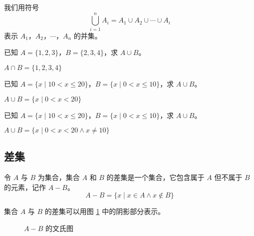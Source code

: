 我们用符号
\begin{equation*}
    \bigcup_{i=1}^n A_i=A_1 \cup A_2 \cup \cdots \cup A_i
\end{equation*}
表示 $A_1$，$A_2$，$\cdots$，$A_n$ 的并集。
\begin{collections}
    \begin{example}
        已知 $A = \{ 1, 2, 3 \}$，$B = \{ 2, 3, 4\}$，求 $A \cup B$。
    \end{example}
    \begin{solution}
        $A \cap B = \{1, 2, 3, 4\}$
    \end{solution}

    \spare

    \begin{example}
        已知 $A = \{ x \mid 10 < x \leq 20 \}$，$B = \{ x \mid 0 < x \leq 10 \}$，求 $A \cup B$。
    \end{example}
    \begin{solution}
        $A \cup B = \{ x \mid 0 < x < 20\}$
    \end{solution}

    \spare

    \begin{example}
        已知 $A = \{ x \mid 10 < x \leq 20 \}$，$B = \{ x \mid 0 < x \leq 10 \}$，求 $A \cup B$。
    \end{example}
    \begin{solution}
        $A \cup B = \{ x \mid 0 < x < 20 \land x \neq 10 \}$
    \end{solution}
\end{collections}

\subsection{差集}
\begin{definition}[集合的差集]\label{def:差集}
    令 $A$ 与 $B$ 为集合，集合 $A$ 和 $B$ 的差集是一个集合，它包含属于 $A$ 但不属于 $B$ 的元素，记作 $A-B$。
    \begin{equation*}
        A - B = \{ x \mid x \in A \land x \notin B \}
    \end{equation*}
\end{definition}

集合 $A$ 与 $B$ 的差集可以用图 \ref{fig:差集文氏图} 中的阴影部分表示。
\begin{figure}[htbp!]
    \centering
    \caption{$A - B$ 的文氏图}
    \label{fig:差集文氏图}
\end{figure}

